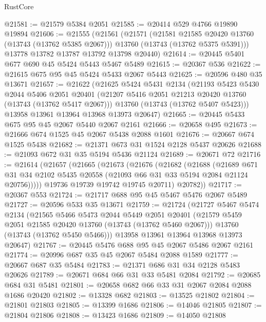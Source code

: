 \begin{lexlean}{RustCore}
\begin{coremodule}
@21581 := @21579 @5384 @2051
@21585 := @20414 @529 @4766 @19890 @19894
@21606 := @21555
    (@21561
      (@21571
        (@21581 @21585 @20420 @13760 (@13743 (@13762 @5385 @2067)))
        @13760
        (@13743 (@13762 @5375 @5391)))
      @13778
      @13782
      @13787
      @13792
      @13798
      @20440)
@21614 := @20445 @5401 @677 @690 @45 @5424 @5443 @5467 @5489
@21615 := @20367 @536
@21622 := @21615 @675 @95 @45 @5424 @5433 @2067 @5443
@21625 := @20596 @480 @35 @13671
@21657 := @21622
    (@21625
      @5424
      @5431
      @2134
      (@21193
        @5423
        @5430
        @2044
        @5406
        @2051
        @20401
        (@21207 @5416 @2051 @21213 @20420 @13760 (@13743 (@13762 @5417 @2067)))
        @13760
        (@13743 (@13762 @5407 @5423)))
      @13958
      @13961
      @13964
      @13968
      @13973
      @20647)
@21665 := @20445 @5433 @675 @95 @45 @2067 @5440 @2067 @2161
@21666 := @20658 @495
@21673 := @21666 @674 @1525 @45 @2067 @5438 @2088 @1601
@21676 := @20667 @674 @1525 @5438
@21682 := @21371 @673 @31 @1524 @2128 @5437 @20626
@21688 := @21093 @672 @31 @35 @5194 @5436 @21124
@21689 := @20671 @72
@21716 := @21614
    (@21657
      (@21665
        (@21673
          (@21676
            (@21682
              (@21688
                (@21689
                  @671
                  @31
                  @34
                  @2102
                  @5435
                  @20558
                  (@21093 @66 @31 @33 @5194 @2084 @21124 @20756)))))
          @19736
          @19739
          @19742
          @19745
          @20711)
        @20782))
@21717 := @20367 @553
@21724 := @21717 @688 @95 @45 @5467 @5476 @2067 @5489
@21727 := @20596 @533 @35 @13671
@21759 := @21724
    (@21727
      @5467
      @5474
      @2134
      (@21565
        @5466
        @5473
        @2044
        @5449
        @2051
        @20401
        (@21579 @5459 @2051 @21585 @20420 @13760 (@13743 (@13762 @5460 @2067)))
        @13760
        (@13743 (@13762 @5450 @5466)))
      @13958
      @13961
      @13964
      @13968
      @13973
      @20647)
@21767 := @20445 @5476 @688 @95 @45 @2067 @5486 @2067 @2161
@21774 := @20996 @687 @35 @45 @2067 @5484 @2088 @1589
@21777 := @20667 @687 @35 @5484
@21783 := @21371 @686 @31 @34 @2128 @5483 @20626
@21789 := @20671 @684 @66 @31 @33 @5481 @2084
@21792 := @20685 @684 @31 @5481
@21801 := @20658 @682 @66 @33 @31 @2067 @2084 @2088 @1686 @20420
@21802 := @13328 @682
@21803 := @13525 @21802
@21804 := @21801 @21803
@21805 := @13399 @1686
@21806 := @14046 @21805
@21807 := @21804 @21806
@21808 := @13423 @1686
@21809 := @14050 @21808

\end{coremodule}
\end{lexlean}
